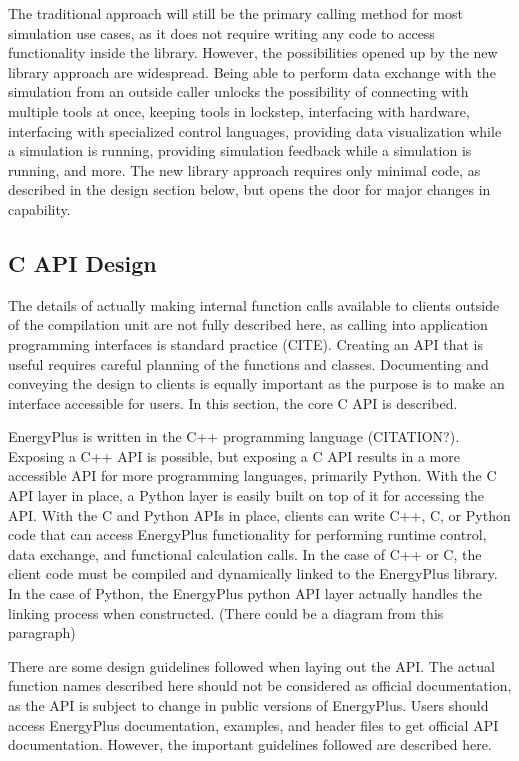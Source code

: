\documentclass[5p]{elsarticle}
\begin{document}
The traditional approach will still be the primary calling method for most simulation use cases, as it does not require writing any code to access functionality inside the library.  However, the possibilities opened up by the new library approach are widespread.  Being able to perform data exchange with the simulation from an outside caller unlocks the possibility of connecting with multiple tools at once, keeping tools in lockstep, interfacing with hardware, interfacing with specialized control languages, providing data visualization while a simulation is running, providing simulation feedback while a simulation is running, and more.  The new library approach requires only minimal code, as described in the design section below, but opens the door for major changes in capability.

  \subsection{C API Design}
The details of actually making internal function calls available to clients outside of the compilation unit are not fully described here, as calling into application programming interfaces is standard practice (CITE).  Creating an API that is useful requires careful planning of the functions and classes.  Documenting and conveying the design to clients is equally important as the purpose is to make an interface accessible for users.  In this section, the core C API is described.

EnergyPlus is written in the C++ programming language (CITATION?).  Exposing a C++ API is possible, but exposing a C API results in a more accessible API for more programming languages, primarily Python.  With the C API layer in place, a Python layer is easily built on top of it for accessing the API.  With the C and Python APIs in place, clients can write C++, C, or Python code that can access EnergyPlus functionality for performing runtime control, data exchange, and functional calculation calls.  In the case of C++ or C, the client code must be compiled and dynamically linked to the EnergyPlus library.  In the case of Python, the EnergyPlus python API layer actually handles the linking process when constructed.  (There could be a diagram from this paragraph)

There are some design guidelines followed when laying out the API.  The actual function names described here should not be considered as official documentation, as the API is subject to change in public versions of EnergyPlus.  Users should access EnergyPlus documentation, examples, and header files to get official API documentation.  However, the important guidelines followed are described here.
\end{document}
